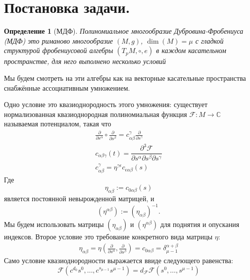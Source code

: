 \documentclass[a4paper, 10pt]{article}
\theoremstyle{plain}
\newtheorem{defin}{Определение}
\newcommand{\defeq}{:=}
\newcommand{\tang}[1][\hspace{0pt}]{\frac{\partial }{\partial #1}}
\begin{document}
\section{Постановка задачи.}
\begin{defin}[МДФ]
    Полиномиальное многообразие Дубровина-Фробениуса (МДФ) это риманово многообразие \((M, g)\), \(\operatorname{dim}(M) = \mu\) с гладкой структурой фробениусовой алгебры \((T_pM, \circ, e)\) в каждом касательном пространстве, для него выполнено несколько условий
\end{defin}

Мы будем смотреть на эти алгебры как на векторные касательные пространства снабжённые ассоциативным умножением.\par
Одно условие это квазиоднородность этого умножения: существует нормализованная квазиоднородная полиномиальная функция \(\mathcal{F}: M \to \mathbb{C}\) называемая потенциалом, такая что  \begin{equation}
    \begin{gathered}
        \tang[s^\alpha] \circ \tang[s^\beta] = c^\gamma_{\alpha\beta}\tang[s^{\gamma}]\\
        c_{\alpha\beta\gamma}(t) = \dfrac{\partial^3 \mathcal{F}}{\partial s^{\alpha}\partial s^{\beta}\partial s^{\gamma}}\\
        c^\gamma_{\alpha\beta} = \eta^{\gamma\epsilon}c_{\epsilon\alpha\beta}(s)
    \end{gathered}
\end{equation}
Где
\[
\eta_{\alpha\beta} \defeq c_{0\alpha\beta}(s)
\]
является постоянной невырожденной матрицей, и
\[
(\eta^{\alpha\beta}) \defeq (\eta_{\alpha\beta})^{-1}.
\]
Мы будем использовать матрицы \((\eta_{\alpha\beta})\) и \((\eta^{\alpha\beta})\) для поднятия и опускания индексов. Второе условие это требование конкретного вида матрицы \(\eta\):
\begin{gather} \eta_{\alpha\beta} = \eta(\tang[s^\alpha], \tang[s^\beta]) = c_{0\alpha\beta} = \delta^{\alpha + \beta}_{\mu-1}
\end{gather}
Само условие квазиоднородности выражается ввиде следующего равенства:
\[\mathcal{F}(c^{d_0}s^0, \dots, c^{s_{\mu-1}}s^{\mu-1}) = d_\mathcal{F}\mathcal{F}(s^0,\dots, s^{\mu-1})\]
\end{document}
